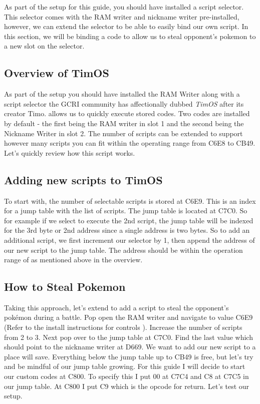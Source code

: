 \documentclass[../main.tex]{subfiles}
\begin{document}
    As part of the setup for this guide, you should have installed a script selector.  This selector comes with the RAM writer and nickname writer pre-installed, however, we can extend the selector to be able to easily bind our own script.  In this section, we will be binding a code to allow us to steal opponent's pokemon to a new slot on the selector.

    \subsection{Overview of TimOS}
    As part of the setup you should have installed the RAM Writer along with a script selector the GCRI community has affectionally dubbed \textit{TimOS} after its creator Timo.  \timos{} allows us to quickly execute stored codes.  Two codes are installed by default - the first being the RAM writer in slot 1 and the second being the Nickname Writer in slot 2.  The number of scripts can be extended to support however many scripts you can fit within the operating range from C6E8 to CB49.  Let's quickly review how this script works.

    \subsection{Adding new scripts to TimOS}
    To start with, the number of selectable scripts is stored at C6E9.  This is an index for a jump table with the list of scripts.  The jump table is located at C7C0.  So for example if we select to execute the 2nd script, the jump table will be indexed for the 3rd byte or 2nd address since a single address is two bytes.  So to add an additional script, we first increment our selector by 1, then append the address of our new script to the jump table.  The address should be within the operation range of \timos{} as mentioned above in the overview.

    \subsection{How to Steal Pokemon}
    Taking this approach, let's extend \timos{} to add a script to steal the opponent's pokémon during a battle.  Pop open the RAM writer and navigate to value C6E9 (Refer to the install instructions for controls \cite{timos}).  Increase the number of scripts from 2 to 3.  Next pop over to the jump table at C7C0.  Find the last value which should point to the nickname writer at D669.  We want to add our new script to a place \timos{} will save.  Everything below the jump table up to CB49 is free, but let's try and be mindful of our jump table growing.  For this guide I will decide to start our custom codes at C800.  To specify this I put 00 at C7C4 and C8 at C7C5 in our jump table.  At C800 I put C9 which is the opcode for return.  Let's test our setup.
\end{document}
